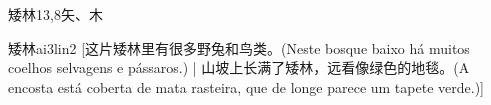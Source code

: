 \begin{entry}{矮林}{13,8}{⽮、⽊}
  \begin{phonetics}{矮林}{ai3lin2}
    [这片矮林里有很多野兔和鸟类。(Neste bosque baixo há muitos coelhos selvagens e pássaros.) | 山坡上长满了矮林，远看像绿色的地毯。(A encosta está coberta de mata rasteira, que de longe parece um tapete verde.)]
  \end{phonetics}
\end{entry}
